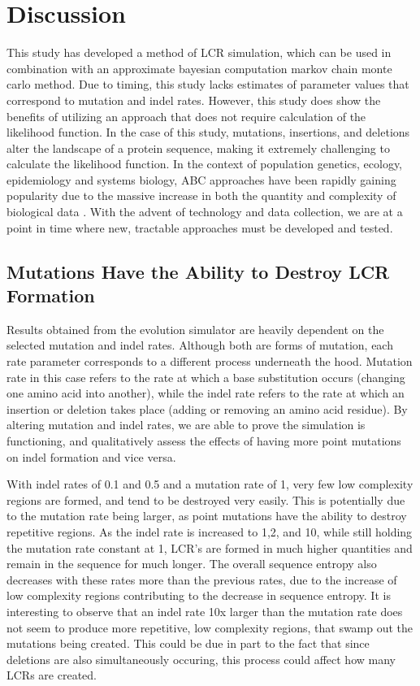 \documentclass[10pt]{article}
\begin{document}
\section{Discussion}

This study has developed a method of LCR simulation, which can be used in combination with an approximate bayesian computation markov chain monte carlo method. Due to timing, this study lacks estimates of parameter values that correspond to mutation and indel rates. However, this study does show the benefits of utilizing an approach that does not require calculation of the likelihood function. In the case of this study, mutations, insertions, and deletions alter the landscape of a protein sequence, making it extremely challenging to calculate the likelihood function. In the context of population genetics, ecology, epidemiology and systems biology, ABC approaches have been rapidly gaining popularity due to the massive increase in both the quantity and complexity of biological data \citep{sunnaaker2013approximate}. With the advent of technology and data collection, we are at a point in time where new, tractable approaches must be developed and tested.

\subsection{Mutations Have the Ability to Destroy LCR Formation}

Results obtained from the evolution simulator are heavily dependent on the selected mutation and indel rates. Although both are forms of mutation, each rate parameter corresponds to a different process underneath the hood. Mutation rate in this case refers to the rate at which a base substitution occurs (changing one amino acid into another), while the indel rate refers to the rate at which an insertion or deletion takes place (adding or removing an amino acid residue). By altering mutation and indel rates, we are able to prove the simulation is functioning, and qualitatively assess the effects of having more point mutations on indel formation and vice versa.

With indel rates of 0.1 and 0.5 and a mutation rate of 1, very few low complexity regions are formed, and tend to be destroyed very easily. This is potentially due to the mutation rate being larger, as point mutations have the ability to destroy repetitive regions. As the indel rate is increased to 1,2, and 10, while still holding the mutation rate constant at 1, LCR's are formed in much higher quantities and remain in the sequence for much longer. The overall sequence entropy also decreases with these rates more than the previous rates, due to the increase of low complexity regions contributing to the decrease in sequence entropy. It is interesting to observe that an indel rate 10x larger than the mutation rate does not seem to produce more repetitive, low complexity regions, that swamp out the mutations being created. This could be due in part to the fact that since deletions are also simultaneously occuring, this process could affect how many LCRs are created.
\end{document}
